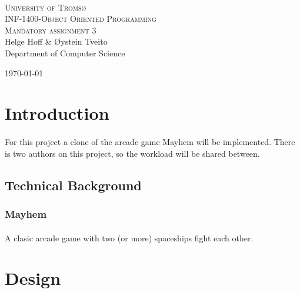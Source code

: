 \documentclass{article}
\def \thetitle {INF-1400-Object Oriented Programming}
\def \thesubtitle {Mandatory assignment 3}
\def \theauthor {Helge Hoff \& Øystein Tveito}
\begin{document}

\begin{titlepage}
\begin{center}

\textsc{\\[3.5cm] \huge University of Tromsø}\\[1.5cm]

\textsc{\LARGE \thetitle}\\[0.5cm]

\textsc{\Large \thesubtitle}\\[1.5cm]

\LARGE{\theauthor} \\[0.5cm] \large{Department of Computer Science}

\vfill
{\large \today}

\end{center}
\thispagestyle{empty}
\end{titlepage}

\newpage{}



\tableofcontents


\newpage{}


\section{Introduction}
\paragraph{}
For this project a clone of the arcade game Mayhem will be implemented. There is two authors on this project, so the workload will be shared between.
\subsection{Technical Background}
\subsubsection{Mayhem} 
\paragraph{}
A clasic arcade game with two (or more) spaceships fight each other. 
\section{Design}
\end{document}
